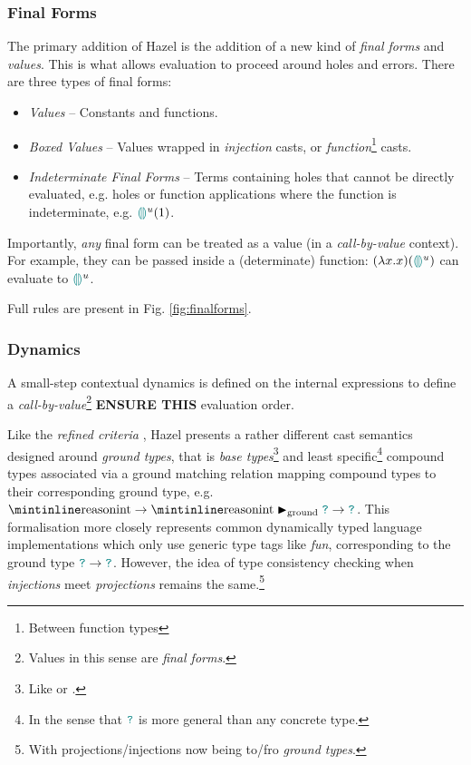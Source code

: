 \subsubsection{Final Forms}\label{sec:HazelFinalForms}
The primary addition of Hazel is the addition of a new kind of \textit{final forms} and \textit{values}. This is what allows evaluation to proceed around holes and errors. There are three types of final forms:
\begin{itemize}
\item \textit{Values} -- Constants and functions.
\item \textit{Boxed Values} -- Values wrapped in \textit{injection} casts, or \textit{function}\footnote{Between function types} casts.
\item \textit{Indeterminate Final Forms} -- Terms containing holes that cannot be directly evaluated, e.g. holes or function applications where the function is indeterminate, e.g. ${\color{teal}\llparenthesis}  {\color{teal}\rrparenthesis}^u(1)$.
\end{itemize}
 Importantly, \textit{any} final form can be treated as a value (in a \textit{call-by-value} context). For example, they can be passed inside a (determinate) function: $(\lambda x. x)({\color{teal}\llparenthesis}  {\color{teal}\rrparenthesis}^u)$ can evaluate to ${\color{teal}\llparenthesis}  {\color{teal}\rrparenthesis}^u$.

Full rules are present in Fig. \ref{fig:finalforms}.

\subsubsection{Dynamics}\label{sec:HazelDynamics}
A small-step contextual dynamics \cite[ch. 5]{PracticalFoundations} is defined on the internal expressions to define a \textit{call-by-value}\footnote{Values in this sense are \textit{final forms}.} \textbf{ENSURE THIS} evaluation order. 

Like the \textit{refined criteria}  \cite{GradualRefined}, Hazel presents a rather different cast semantics designed around \textit{ground types}, that is \textit{base types}\footnote{Like  or .} and least specific\footnote{In the sense that ${\color{teal}\texttt{?}}$ is more general than any concrete type.} compound types associated via a ground matching relation mapping compound types to their corresponding ground type, e.g. $\code{int} \to \code{int} \groundmatch \dyn \to \dyn$. This formalisation more closely represents common dynamically typed language implementations which only use generic type tags like \textit{fun}, corresponding to the ground type ${\color{teal}\texttt{?}} \to {\color{teal}\texttt{?}}$. However, the idea of type consistency checking when \textit{injections} meet \textit{projections} remains the same.\footnote{With projections/injections now being to/fro \textit{ground types}.}


